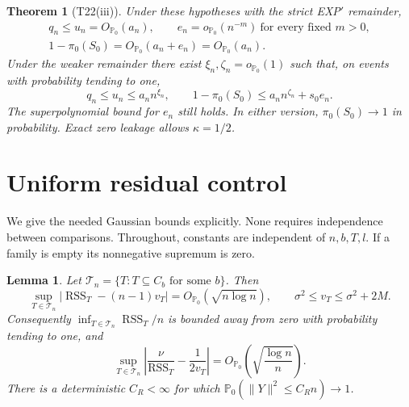 \documentclass[11pt]{article}
\newtheorem{theorem}{Theorem}
\newtheorem{lemma}{Lemma}
\theoremstyle{remark}\newtheorem{remark}{Remark}
\newcommand{\PP}{\mathbb P_0}
\newcommand{\op}{o_{\PP}}
\newcommand{\Op}{O_{\PP}}
\newcommand{\RSS}{\operatorname{RSS}}
\newcommand{\Tc}{\mathcal T_n}
\begin{document}
\begin{theorem}[T22(iii)]\label{thm:main}
Under these hypotheses with the strict EXP$'$ remainder,
\begin{gather*}
 q_n\le u_n=\Op(a_n),\qquad
 e_n=\op(n^{-m})\ \text{for every fixed }m>0,\\
 1-\pi_0(S_0)=\Op(a_n+e_n)=\Op(a_n).
\end{gather*}
Under the weaker remainder there exist
$\xi_n,\zeta_n=\op(1)$ such that, on events with probability tending to one,
\[
 q_n\le u_n\le a_n n^{\xi_n},\qquad
 1-\pi_0(S_0)\le a_n n^{\zeta_n}+s_0e_n.
\]
The superpolynomial bound for $e_n$ still holds. In either version,
$\pi_0(S_0)\to1$ in probability. Exact zero leakage allows $\kappa=1/2$.
\end{theorem}

\section{Uniform residual control}

We give the needed Gaussian bounds explicitly. None requires independence
between comparisons. Throughout, constants are independent of $n,b,T,l$.
If a family is empty its nonnegative supremum is zero.

\begin{lemma}\label{lem:residual}
Let $\Tc=\{T:T\subseteq C_b\text{ for some }b\}$. Then
\begin{equation}\label{eq:residual}
 \sup_{T\in\Tc}|\RSS_T-(n-1)v_T|=\Op(\sqrt{n\log n}),\qquad
 \sigma^2\le v_T\le\sigma^2+2M.
\end{equation}
Consequently $\inf_{T\in\Tc}\RSS_T/n$ is bounded away from zero
with probability tending to one, and
\begin{equation}\label{eq:denominator}
 \sup_{T\in\Tc}\left|\frac{\nu}{\RSS_T}-\frac1{2v_T}\right|
 =\Op\left(\sqrt{\frac{\log n}{n}}\right).
\end{equation}
There is a deterministic $C_R<\infty$ for which
$\PP(\|Y\|^2\le C_Rn)\to1$.
\end{lemma}
\end{document}
